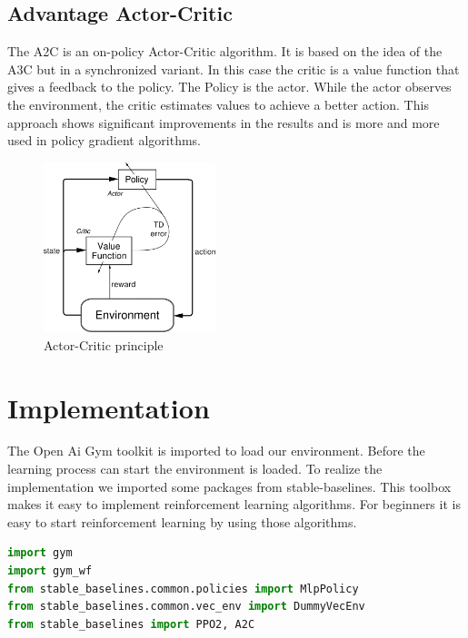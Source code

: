 \documentclass[sigconf]{acmart}
\begin{document}
\subsection{Advantage Actor-Critic}
 The A2C is an on-policy Actor-Critic algorithm. 
 It is based on the idea of the A3C but in a synchronized variant.
 In this case the critic is a value function that gives a feedback to the policy.
 The Policy is the actor. While the actor observes the environment, the critic estimates values to achieve a better action.
 This approach shows significant improvements in the results and is more and more used in policy gradient algorithms.
 
 
\begin{figure}[ht]
 \centering
 \includegraphics[width=50mm]{actor-critic.png}
  \caption{Actor-Critic principle}
  \label{fig:loss}
\end{figure}
 

\section{Implementation}
The Open Ai Gym toolkit is imported to load our environment.
Before the learning process can start the environment is loaded.
To realize the implementation we imported some packages from stable-baselines. 
This toolbox makes it easy to implement reinforcement learning algorithms.
For beginners it is easy to start reinforcement learning by using those algorithms.

\vspace{2.5mm}

\begin{lstlisting}[language=Python, caption=Imports]
import gym
import gym_wf
from stable_baselines.common.policies import MlpPolicy
from stable_baselines.common.vec_env import DummyVecEnv
from stable_baselines import PPO2, A2C
\end{lstlisting}
\vspace{2.5mm} 
 
\end{document}
